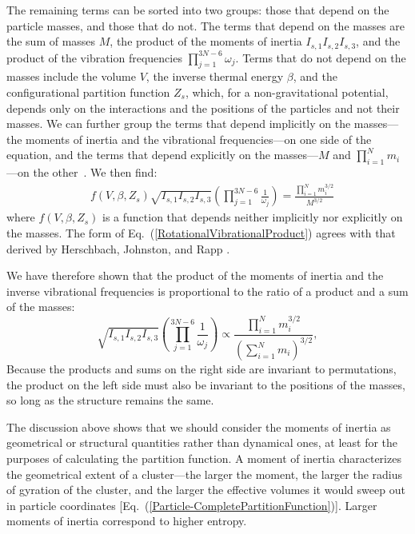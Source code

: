 \documentclass[pre, aps, twocolumn, reprint, amsmath,amssymb, showpacs,
superscriptaddress] {revtex4-1}
\begin{document}
The remaining terms can be sorted into two groups: those that depend on
the particle masses, and those that do not. The terms that depend on the
masses are the sum of masses $M$, the product of the moments of
inertia $I_{s, 1} I_{s, 2} I_{s, 3}$, and the product of the vibration
frequencies $\prod_{j=1}^{3N-6}\omega_j$. Terms that do not depend on
the masses include the volume $V$, the inverse thermal energy $\beta$,
and the configurational partition function $Z_s$, which, for a
non-gravitational potential, depends only on the interactions and the
positions of the particles and not their masses. We can further group
the terms that depend implicitly on the masses---the moments of inertia
and the vibrational frequencies---on one side of the equation, and the
terms that depend explicitly on the masses---$M$ and $\prod_{i=1}^N
m_i$---on the other~\cite{perry_thesis}. We then find:
\begin{equation}\label{RotationalVibrationalProduct}
	\begin{split}
    	&f(V, \beta, Z_s) \sqrt{I_{s, 1} I_{s, 2} I_{s, 3}} 
        \left( \prod_{j=1}^{3N-6} \frac{1}{\omega_j} \right) = \frac{\prod_{i=1}^{N} m_i^{3/2}}{M^{3/2}}
    \end{split}
\end{equation}
where $f(V, \beta, Z_s)$ is a function that depends neither implicitly
nor explicitly on the masses. The form of
Eq.~(\ref{RotationalVibrationalProduct}) agrees with that derived by
Herschbach, Johnston, and Rapp \cite{herschbach59}.

We have therefore shown that the product of the moments of inertia and
the inverse vibrational frequencies is proportional to the ratio of a
product and a sum of the masses:
\begin{equation}
    \sqrt{I_{s, 1} I_{s, 2} I_{s, 3}} \left( \prod_{j=1}^{3N-6} \frac{1}{\omega_j} \right) \propto
    \frac{\prod_{i=1}^{N} m_i^{3/2}}{\left( \sum_{i=1}^{N} m_i \right)^{3/2}},
\end{equation}
Because the products and sums on the right side are invariant to
permutations, the product on the left side must also be invariant to the
positions of the masses, so long as the structure remains the same.

The discussion above shows that we should consider the moments of
inertia as geometrical or structural quantities rather than dynamical
ones, at least for the purposes of calculating the partition function. A
moment of inertia characterizes the geometrical extent of a
cluster---the larger the moment, the larger the radius of gyration of
the cluster, and the larger the effective volumes it would sweep out in
particle coordinates [Eq.~(\ref{Particle-CompletePartitionFunction})].
Larger moments of inertia correspond to higher entropy.
\end{document}
